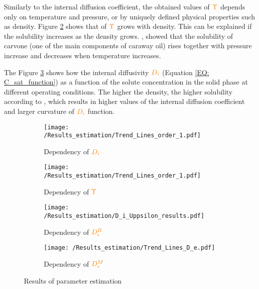 \documentclass[../Article_Model_Parameters.tex]{subfiles}
\begin{document}
	Similarly to the internal diffusion coefficient, the obtained values of ${\color{orange}\Upsilon}$ depends only on temperature and pressure, or by uniquely defined physical properties such as density. Figure \ref{fig: results_upsilon} shows that of ${\color{orange}\Upsilon}$ grows with density. This can be explained if the solubility increases as the density grows. \citet{Shojaie2010}, showed that the solubility of carvone (one of the main components of caraway oil) rises together with pressure increase and decreases when temperature increases.
	
	The Figure \ref{fig:Di_upsilon_res} shows how the internal diffusivity ${\color{orange}D_i}$ (Equation \ref{EQ: C_sat_function}) as a function of the solute concentration in the solid phase at different operating conditions. The higher the density, the higher solubility according to \citet{Shojaie2010}, which results in higher values of the internal diffusion coefficient and larger curvature of ${\color{orange}D_i}$ function.

		\begin{figure}[!h]
		\centering
		\begin{subfigure}[b]{0.49\columnwidth}
			\centering
			\texttt{[image: /Results\_estimation/Trend\_Lines\_order\_1.pdf]}
			\caption{Dependency of ${\color{orange}D_i}$}
			\label{fig: results_DI}
		\end{subfigure}
		\begin{subfigure}[b]{0.49\columnwidth}
			\centering
			\texttt{[image: /Results\_estimation/Trend\_Lines\_order\_1.pdf]}
			\caption{Dependency of ${\color{orange}\Upsilon}$}
			\label{fig: results_upsilon}
		\end{subfigure}
		\hfill
		\begin{subfigure}[b]{0.49\columnwidth}
			\texttt{[image: /Results\_estimation/D\_i\_Uppsilon\_results.pdf]}
			\caption{Dependency of ${\color{orange}D^R_i}$}
			\label{fig:Di_upsilon_res}
		\end{subfigure}
		\begin{subfigure}[b]{0.49\columnwidth}
			\centering
			\texttt{[image: /Results\_estimation/Trend\_Lines\_D\_e.pdf]}
			\caption{Dependency of ${\color{orange}D^M_e}$}
			\label{fig: results_De}
		\end{subfigure}
		\caption{Results of parameter estimation}
		\label{fig: estimation_results_DI_GAMMA}
	\end{figure}
	
\end{document}
